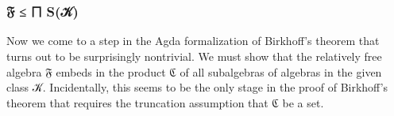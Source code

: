 \begin{code}
\AgdaSymbol{(}\AgdaSpace{}%
\AgdaSymbol{)}\AgdaSpace{}%
\<%
\\
\>[1][@{}l@{\AgdaIndent{0}}]%
\>[2]\<%
\\
\>[2][@{}l@{\AgdaIndent{0}}]%
\>[3]\AgdaSpace{}%
\AgdaSymbol{:}\AgdaSpace{}%
\AgdaSpace{}%
\AgdaSpace{}%
\<%
\\
%
\>[3]\AgdaSpace{}%
\AgdaSymbol{=}\AgdaSpace{}%
\AgdaSpace{}%
\AgdaSpace{}%
\<%
\\
%
\\[\AgdaEmptyExtraSkip]%
%
\>[3]\AgdaSpace{}%
\AgdaSymbol{:}\AgdaSpace{}%
\AgdaSpace{}%
\AgdaSpace{}%
\AgdaSymbol{\{}\AgdaSymbol{\}\{}\AgdaSymbol{\}(}\AgdaSymbol{\{}\AgdaSymbol{\}\{}\AgdaSymbol{\}}\AgdaSpace{}%
\AgdaSymbol{)}\<%
\\
%
\>[3]\AgdaSpace{}%
\AgdaSymbol{=}\AgdaSpace{}%
\<%
\\
%
\\[\AgdaEmptyExtraSkip]%
%
\>[3]\AgdaSpace{}%
\AgdaSymbol{:}\AgdaSpace{}%
\AgdaSpace{}%
\AgdaSpace{}%
\AgdaSymbol{\{}\AgdaSymbol{\}\{}\AgdaSymbol{\}}\AgdaSpace{}%
\<%
\\
%
\>[3]\AgdaSpace{}%
\AgdaSymbol{=}\AgdaSpace{}%
\AgdaSpace{}%
\<%
\\
%
\\[\AgdaEmptyExtraSkip]%
%
\>[3]\AgdaSpace{}%
\AgdaSymbol{:}\AgdaSpace{}%
\AgdaSpace{}%
\AgdaSpace{}%
\<%
\\
%
\>[3]\AgdaSpace{}%
\AgdaSymbol{=}\AgdaSpace{}%
\AgdaSpace{}%
\AgdaSpace{}%
\AgdaSpace{}%
\AgdaSymbol{(}\AgdaSpace{}%
\AgdaSymbol{)}\AgdaSpace{}%
\<%
\end{code}

\subsubsection{𝔉 ≤ ⨅ S(𝒦)}\label{F-in-classproduct}
Now we come to a step in the Agda formalization of Birkhoff's theorem that turns out to be surprisingly nontrivial. We must show that the relatively free algebra \af 𝔉 embeds in the product \af ℭ of all subalgebras of algebras in the given class \ab 𝒦.  Incidentally, this seems to be the only stage in the proof of Birkhoff's theorem that requires the truncation assumption that ℭ be a set.

